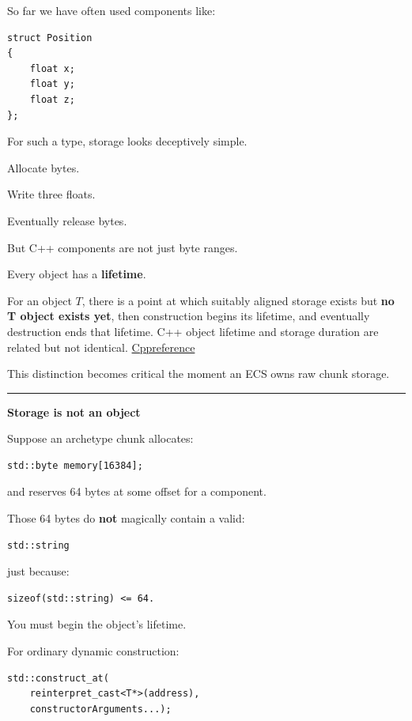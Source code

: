 So far we have often used components like:

\begin{verbatim}
struct Position
{
    float x;
    float y;
    float z;
};
\end{verbatim}

For such a type, storage looks deceptively simple.

Allocate bytes.

Write three floats.

Eventually release bytes.

But C++ components are not just byte ranges.

Every object has a \textbf{lifetime}.

For an object \(T\), there is a point at which suitably aligned storage exists but \textbf{no T object exists yet}, then construction begins its lifetime, and eventually destruction ends that lifetime. C++ object lifetime and storage duration are related but not identical. \href{https://en.cppreference.com/cpp/language/lifetime?utm_source=chatgpt.com}{Cppreference}

This distinction becomes critical the moment an ECS owns raw chunk storage.

\begin{center}\rule{0.5\linewidth}{0.5pt}\end{center}

\textbf{Storage is not an object}

Suppose an archetype chunk allocates:

\begin{verbatim}
std::byte memory[16384];
\end{verbatim}

and reserves 64 bytes at some offset for a component.

Those 64 bytes do \textbf{not} magically contain a valid:

\begin{verbatim}
std::string
\end{verbatim}

just because:

\begin{verbatim}
sizeof(std::string) <= 64.
\end{verbatim}

You must begin the object's lifetime.

For ordinary dynamic construction:

\begin{verbatim}
std::construct_at(
    reinterpret_cast<T*>(address),
    constructorArguments...);
\end{verbatim}


